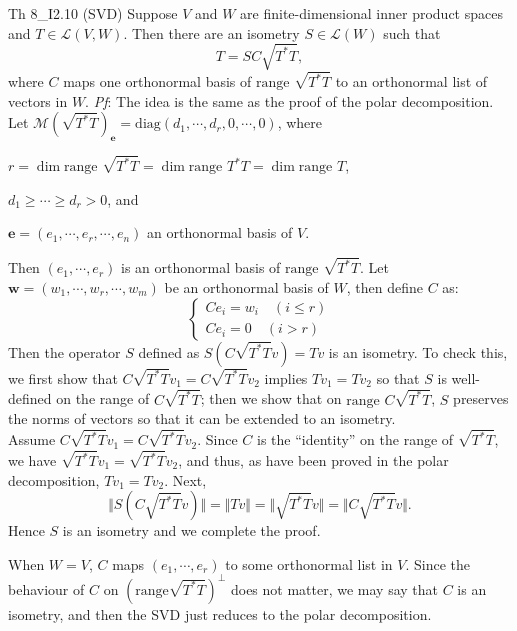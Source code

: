 \documentclass{article}
\begin{document}
\begin{Th}{Th 8\_I2.10 (SVD)}
    Suppose $V$ and $W$ are finite-dimensional inner product spaces and $T\in\mathcal{L}(V,W)$. Then there are an isometry $S\in\mathcal{L}(W)$ such that
    $$ T = SC\sqrt{T^\ast T}, $$
    where $C$ maps one orthonormal basis of $\text{range } \sqrt{T^\ast T}$ to an orthonormal list of vectors in $W$.
    \tcblower
    \textit{Pf}: The idea is the same as the proof of the polar decomposition. \\
    Let $\mathcal{M}(\sqrt{T^\ast T})_{\pmb{e}} = \text{diag}(d_1,\cdots,d_r,0,\cdots,0)$, where
    \begin{compactenum}
        \item $r = \dim\text{range } \sqrt{T^\ast T} = \dim\text{range }T^\ast T = \dim\text{range }T$,
        \item $d_1\geq\cdots\geq d_r > 0$, and
        \item $\pmb{e} = (e_1,\cdots,e_r,\cdots,e_n)$ an orthonormal basis of $V$.
    \end{compactenum}
    Then $(e_1,\cdots,e_r)$ is an orthonormal basis of $\text{range } \sqrt{T^\ast T}$. Let $\pmb{w} = (w_1,\cdots,w_r,\cdots,w_m)$ be an orthonormal basis of $W$, then define $C$ as:
    $$ \begin{cases}
        Ce_i = w_i \quad (i\leq r) \\
        Ce_i = 0 \quad (i>r)
    \end{cases} $$
    Then the operator $S$ defined as $S \left(C\sqrt{T^\ast T}v\right) = Tv$ is an isometry. To check this, we first show that $C\sqrt{T^\ast T}v_1 = C\sqrt{T^\ast T}v_2$ implies $Tv_1 = Tv_2$ so that $S$ is well-defined on the range of $C\sqrt{T^\ast T}$; then we show that on $\text{range } C\sqrt{T^\ast T}$, $S$ preserves the norms of vectors so that it can be extended to an isometry.\\
    Assume $C\sqrt{T^\ast T}v_1 = C\sqrt{T^\ast T}v_2$. Since $C$ is the ``identity'' on the range of $\sqrt{T^\ast T}$, we have $\sqrt{T^\ast T}v_1 = \sqrt{T^\ast T}v_2$, and thus, as have been proved in the polar decomposition, $Tv_1 = Tv_2$. Next, 
    $$ \Vert S(C\sqrt{T^\ast T}v)\Vert = \Vert Tv\Vert = \Vert \sqrt{T^\ast T}v\Vert = \Vert C\sqrt{T^\ast T}v\Vert. $$
    Hence $S$ is an isometry and we complete the proof.
\end{Th}

When $W = V$, $C$ maps $(e_1,\cdots,e_r)$ to some orthonormal list in $V$. Since the behaviour of $C$ on $(\text{range}\sqrt{T^\ast T})^\perp$ does not matter, we may say that $C$ is an isometry, and then the SVD just reduces to the polar decomposition.
\end{document}
